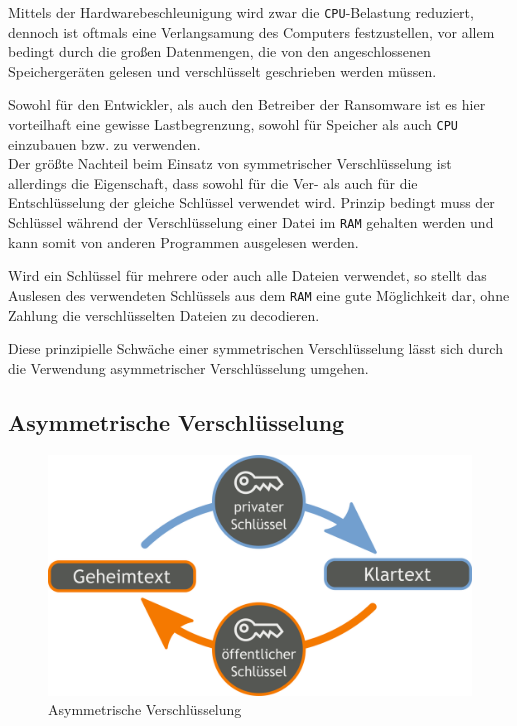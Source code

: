 Mittels der Hardwarebeschleunigung wird zwar die \texttt{CPU}-Belastung reduziert, dennoch ist oftmals eine Verlangsamung des Computers festzustellen, vor allem bedingt durch die großen Datenmengen, die von den angeschlossenen Speichergeräten gelesen und verschlüsselt geschrieben werden müssen.

Sowohl für den Entwickler, als auch den Betreiber der Ransomware ist es hier vorteilhaft eine gewisse Lastbegrenzung, sowohl für Speicher als auch \texttt{CPU} einzubauen bzw. zu verwenden.
\\

Der größte Nachteil beim Einsatz von symmetrischer Verschlüsselung ist allerdings die Eigenschaft, dass sowohl für die Ver- als auch für die Entschlüsselung der gleiche Schlüssel verwendet wird. Prinzip bedingt muss der Schlüssel während der Verschlüsselung einer Datei im \texttt{RAM} gehalten werden und kann somit von anderen Programmen ausgelesen werden.

Wird ein Schlüssel für mehrere oder auch alle Dateien verwendet, so stellt das Auslesen des verwendeten Schlüssels aus dem \texttt{RAM} eine gute Möglichkeit dar, ohne Zahlung die verschlüsselten Dateien zu decodieren. 

Diese prinzipielle Schwäche einer symmetrischen Verschlüsselung lässt sich durch die Verwendung asymmetrischer Verschlüsselung umgehen.

\subsection{Asymmetrische Verschlüsselung}
\label{sec:asym_verschl}

\begin{figure}[h!]
	\centering
	\includegraphics[scale=0.25]{img/AsymKrypto.png}
	\caption{Asymmetrische Verschlüsselung \cite{img:crypto:asym}}
	\label{fig:asym_verschl}
\end{figure}

